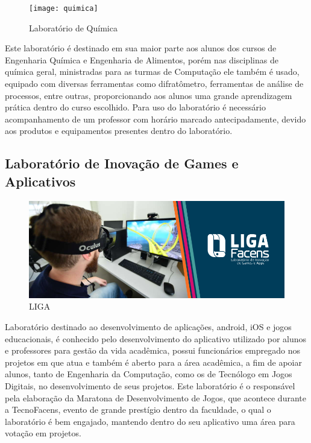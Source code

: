 \documentclass[
	12pt,				%
	oneside,			%
	a4paper,			%
	chapter=TITLE,		%
	section=TITLE,		%
	sumario=tradicional %
	english,			%
	french,				%
	spanish,			%
	brazil				%
	]{abntex2}
\begin{document}
\begin{figure}[htb]
	\caption{\label{fig:quimica} Laboratório de Química}
	\begin{center}
		\texttt{[image: quimica]}
	\end{center}
\end{figure}

Este laboratório é destinado em sua maior parte aos alunos dos cursos de Engenharia Química e Engenharia de Alimentos, porém nas disciplinas de química geral, ministradas para as turmas de Computação ele também é usado, equipado com diversas ferramentas como difratômetro, ferramentas de análise de processos, entre outras, proporcionando aos alunos uma grande aprendizagem prática dentro do curso escolhido. Para uso do laboratório é necessário acompanhamento de um professor com horário marcado antecipadamente, devido aos produtos e equipamentos presentes dentro do laboratório.

\subsection{Laboratório de Inovação de Games e Aplicativos}

\begin{figure}[htb]
	\caption{\label{fig:liga} LIGA}
	\begin{center}
		\includegraphics[scale=0.5]{liga}
	\end{center}
\end{figure}

Laboratório destinado ao desenvolvimento de aplicações, android, iOS e jogos educacionais, é conhecido pelo desenvolvimento do aplicativo utilizado por alunos e professores para gestão da vida acadêmica, possui funcionários empregado nos projetos em que atua e também é aberto para a área acadêmica, a fim de apoiar alunos, tanto de Engenharia da Computação, como os de Tecnólogo em Jogos Digitais, no desenvolvimento de seus projetos. Este laboratório é o responsável pela elaboração da Maratona de Desenvolvimento de Jogos, que acontece durante a TecnoFacens, evento de grande prestígio dentro da faculdade, o qual o laboratório é bem engajado, mantendo dentro do seu aplicativo uma área para votação em projetos.
\end{document}
